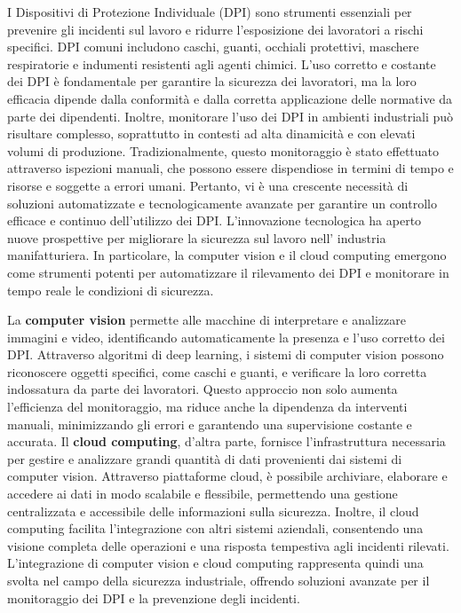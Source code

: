 I Dispositivi di Protezione Individuale (DPI) sono strumenti essenziali per prevenire gli incidenti sul lavoro e ridurre l'esposizione dei lavoratori a rischi specifici. DPI comuni includono caschi, guanti, occhiali protettivi, maschere respiratorie e indumenti resistenti agli agenti chimici. L'uso corretto e costante dei DPI è fondamentale per garantire la sicurezza dei lavoratori, ma la loro efficacia dipende dalla conformità e dalla corretta applicazione delle normative da parte dei dipendenti. Inoltre, monitorare l'uso dei DPI in ambienti industriali può risultare complesso, soprattutto in contesti ad alta dinamicità e con elevati volumi di produzione. Tradizionalmente, questo monitoraggio è stato effettuato attraverso ispezioni manuali, che possono essere dispendiose in termini di tempo e risorse e soggette a errori umani. Pertanto, vi è una crescente necessità di soluzioni automatizzate e tecnologicamente avanzate per garantire un controllo efficace e continuo dell'utilizzo dei DPI. L'innovazione tecnologica ha aperto nuove prospettive per migliorare la sicurezza sul lavoro nell' industria manifatturiera. In particolare, la computer vision e il cloud computing emergono come strumenti potenti per automatizzare il rilevamento dei DPI e monitorare in tempo reale le condizioni di sicurezza.

La {\bfseries computer vision} permette alle macchine di interpretare e analizzare immagini e video, identificando automaticamente la presenza e l'uso corretto dei DPI. Attraverso algoritmi di deep learning, i sistemi di computer vision possono riconoscere oggetti specifici, come caschi e guanti, e verificare la loro corretta indossatura da parte dei lavoratori. Questo approccio non solo aumenta l'efficienza del monitoraggio, ma riduce anche la dipendenza da interventi manuali, minimizzando gli errori e garantendo una supervisione costante e accurata. Il {\bfseries cloud computing}, d'altra parte, fornisce l'infrastruttura necessaria per gestire e analizzare grandi quantità di dati provenienti dai sistemi di computer vision. Attraverso piattaforme cloud, è possibile archiviare, elaborare e accedere ai dati in modo scalabile e flessibile, permettendo una gestione centralizzata e accessibile delle informazioni sulla sicurezza. Inoltre, il cloud computing facilita l'integrazione con altri sistemi aziendali, consentendo una visione completa delle operazioni e una risposta tempestiva agli incidenti rilevati. L'integrazione di computer vision e cloud computing rappresenta quindi una svolta nel campo della sicurezza industriale, offrendo soluzioni avanzate per il monitoraggio dei DPI e la prevenzione degli incidenti. 


